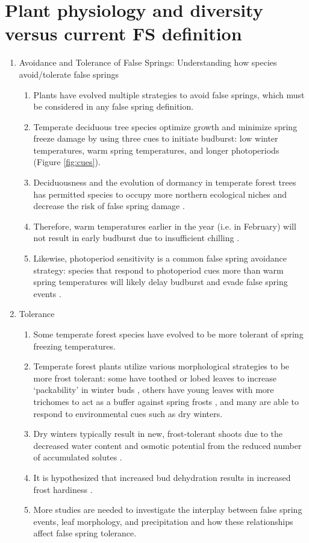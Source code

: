 \documentclass{article}\usepackage[]{graphicx}\usepackage[]{color}
\begin{document}
\section*{Plant physiology and diversity versus current FS definition}
\begin{enumerate}
\item Avoidance and Tolerance of False Springs: Understanding how species avoid/tolerate false springs 
\begin {enumerate}
\item Plants have evolved multiple strategies to avoid false springs, which must be considered in any false spring definition.
\item Temperate deciduous tree species optimize growth and minimize spring freeze damage by using three cues to initiate budburst: low winter temperatures, warm spring temperatures, and longer photoperiods \citep{Cleland2007, Polgar2011} (Figure \ref{fig:cues}).

\item Deciduousness and the evolution of dormancy in temperate forest trees has permitted species to occupy more northern ecological niches and decrease the risk of false spring damage \citep{Samish1954}.
\item Therefore, warm temperatures earlier in the year (i.e. in February) will not result in early budburst due to insufficient chilling \citep{Basler2012}.
\item Likewise, photoperiod sensitivity is a common false spring avoidance strategy: species that respond to photoperiod cues more than warm spring temperatures will likely delay budburst and evade false spring events \citep{Basler2014}.
\end {enumerate}
\item Tolerance
\begin{enumerate}
\item Some temperate forest species have evolved to be more tolerant of spring freezing temperatures.
\item Temperate forest plants utilize various morphological strategies to be more frost tolerant: some have toothed or lobed leaves to increase `packability' in winter buds \citep{Edwards2017}, others have young leaves with more trichomes to act as a buffer against spring frosts \citep{Agrawal2004}, and many are able to respond to environmental cues such as dry winters. 
\item Dry winters typically result in new, frost-tolerant shoots due to the decreased water content and osmotic potential from the reduced number of accumulated solutes \citep{Morin2007, Hofmann2015}.
\item It is hypothesized that increased bud dehydration results in increased frost hardiness \citep{Beck2007, Nielsen2009, Poirier2010, Kathke2011, Hofmann2015}.
\item More studies are needed to investigate the interplay between false spring events, leaf morphology, and precipitation and how these relationships affect false spring tolerance.
\end{enumerate}
\end{enumerate}
\end{document}
